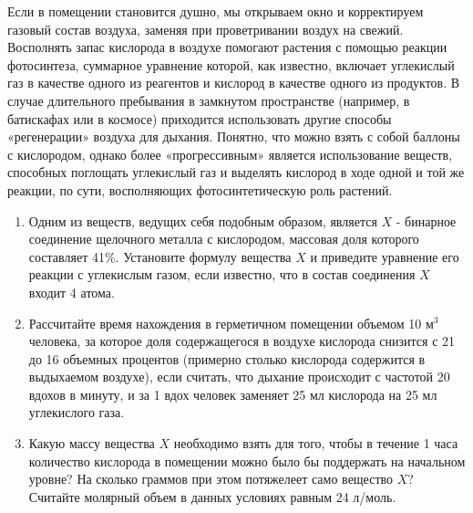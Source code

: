 
Если в помещении становится душно, мы открываем окно и корректируем газовый состав воздуха, заменяя при 
проветривании воздух на свежий. Восполнять запас кислорода в воздухе помогают растения с помощью реакции 
фотосинтеза, суммарное уравнение которой, как известно, включает углекислый газ в качестве одного из реагентов 
и кислород в качестве одного из продуктов. В случае длительного пребывания в замкнутом пространстве (например, в батискафах или в космосе) приходится использовать другие способы «регенерации» воздуха для 
дыхания. Понятно, что можно взять с собой баллоны с кислородом, однако более «прогрессивным» является 
использование веществ, способных поглощать углекислый газ и выделять кислород в ходе одной и той же реакции, 
по сути, восполняющих фотосинтетическую роль растений.

\begin{enumerate}
    \item Одним из веществ, ведущих себя подобным образом, является $X$ - бинарное соединение щелочного металла с кислородом, массовая доля которого составляет 41\%. Установите формулу вещества $X$ и приведите уравнение его реакции с углекислым газом, если известно, что в состав соединения $X$ входит 4 атома.
    \item Рассчитайте время нахождения в герметичном помещении объемом 10 м$^3$ человека, за которое доля содержащегося в воздухе кислорода снизится с 21 до 16 объемных процентов (примерно столько кислорода содержится в выдыхаемом воздухе), если считать, что дыхание происходит с частотой 20 вдохов в минуту, и за 1 вдох человек заменяет 25 мл кислорода на 25 мл углекислого газа.
    \item Какую массу вещества $X$ необходимо взять для того, чтобы в течение 1 часа количество кислорода в помещении можно было бы поддержать на начальном уровне? На сколько граммов при этом потяжелеет само вещество $X$? Считайте молярный объем в данных условиях равным 24 л/моль.    
\end{enumerate}

